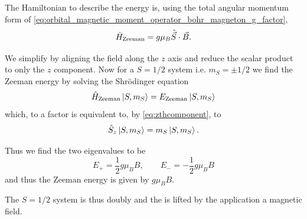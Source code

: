 The Hamiltonian to describe the energy is, using the total angular momentum form of \eqref{eq:orbital_magnetic_moment_operator_bohr_magneton_g_factor}, 
\begin{equation}
    \hat{H}_{\ce{Zeeman}} = g \mu_B \hat{\vec{S}}\cdot\vec{B}. 
    \label{eq:Zeeman_Hamiltonian}
\end{equation}

We simplify by aligning the field along the $z$ axis and reduce the scalar product to only the $z$ component. Now for a $S=1/2$ system i.e. $m_S = \pm 1/2$ we find the Zeeman energy by solving the Shr\"odinger equation 
\begin{equation}
    \hat{H}_{\ce{Zeeman}} \ket{S, m_S} = E_{\ce{Zeeman}}\ket{S, m_S} 
\end{equation}
which, to a factor is equivalent to, by \eqref{eq:zthcomponent}, to
\begin{equation}
    \hat{S}_{z} \ket{S, m_S} = m_S\ket{S, m_S}.
\end{equation}

Thus we find the two eigenvalues to be
\begin{equation}
E_+ =\frac{1}{2}g\mu_BB, \qquad E_-=-\frac{1}{2}g\mu_BB
    \label{eq:zeeman_energy}
\end{equation}
and thus the Zeeman energy is given by $g\mu_B B$. 



The $S=1/2$ system is thus doubly  and the  is lifted by the application a magnetic field. 
%





